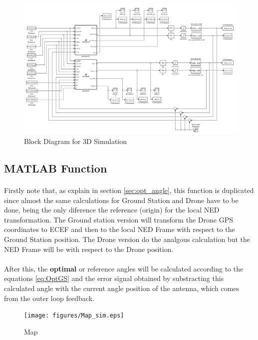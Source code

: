 \clearpage

\begin{figure}
	\centering
	\includegraphics[width=1.1\textwidth,height=1.1\textheight,keepaspectratio]{figures/diagram_3D.png}
	\caption{Block Diagram for 3D Simulation}
   	\label{fig:diagram3D}
\end{figure}

\clearpage

\subsection*{MATLAB Function}
\paragraph{}Firstly note that, as explain in section \ref{sec:opt_angle}, this function is duplicated since almost the same calculations for Ground Station and Drone have to be done, being the only diference the reference (origin) for the local NED transformation.
The Ground station version will transform the Drone GPS coordinates to ECEF and then to the local NED Frame with respect to the Ground Station position. The Drone version do the analgous calculation but the NED Frame will be with respect to the Drone position.
\paragraph{}After this, the \textbf{optimal} or {reference} angles will be calculated according to the equations \ref{eq:OptGS} and the error signal obtained by substracting this calculated angle with the current angle position of the antenna, which comes from the outer loop feedback.

\begin{figure}[h]
	\centering
	\texttt{[image: figures/Map\_sim.eps]}
	\caption{Map}
   	\label{fig:map}
\end{figure}

